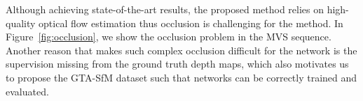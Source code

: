 \documentclass[letterpaper, 10 pt, conference]{ieeeconf}  %
\begin{document}
Although achieving state-of-the-art results, the proposed method relies on high-quality optical flow estimation thus occlusion is challenging for the method. In Figure~\ref{fig:occlusion}, we show the occlusion problem in the MVS sequence. Another reason that makes such complex occlusion difficult for the network is the supervision missing from the ground truth depth maps, which also motivates us to propose the GTA-SfM dataset such that networks can be correctly trained and evaluated.
 
{\small
% 


}
 
 
 
\end{document}
